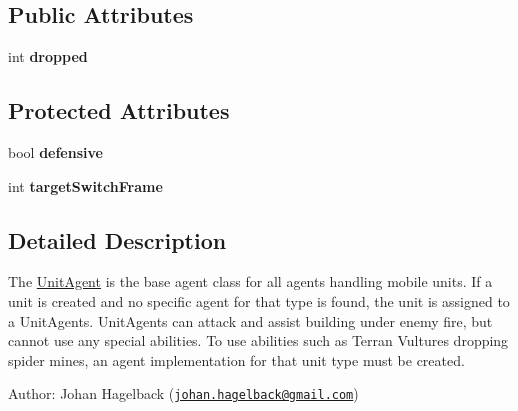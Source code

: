 \subsection*{Public Attributes}
\begin{DoxyCompactItemize}
\item 
\hypertarget{class_unit_agent_a9dfc617758398393fd14467beb0d9c69}{int {\bfseries dropped}}\label{class_unit_agent_a9dfc617758398393fd14467beb0d9c69}

\end{DoxyCompactItemize}
\subsection*{Protected Attributes}
\begin{DoxyCompactItemize}
\item 
\hypertarget{class_unit_agent_a707d6767772e300cff32f3265d1e89ca}{bool {\bfseries defensive}}\label{class_unit_agent_a707d6767772e300cff32f3265d1e89ca}

\item 
\hypertarget{class_unit_agent_a1d22a0216133b988405f5e79c6ba88e9}{int {\bfseries target\-Switch\-Frame}}\label{class_unit_agent_a1d22a0216133b988405f5e79c6ba88e9}

\end{DoxyCompactItemize}


\subsection{Detailed Description}
The \hyperlink{class_unit_agent}{Unit\-Agent} is the base agent class for all agents handling mobile units. If a unit is created and no specific agent for that type is found, the unit is assigned to a Unit\-Agents. Unit\-Agents can attack and assist building under enemy fire, but cannot use any special abilities. To use abilities such as Terran Vultures dropping spider mines, an agent implementation for that unit type must be created.

Author\-: Johan Hagelback (\href{mailto:johan.hagelback@gmail.com}{\tt johan.\-hagelback@gmail.\-com}) 

